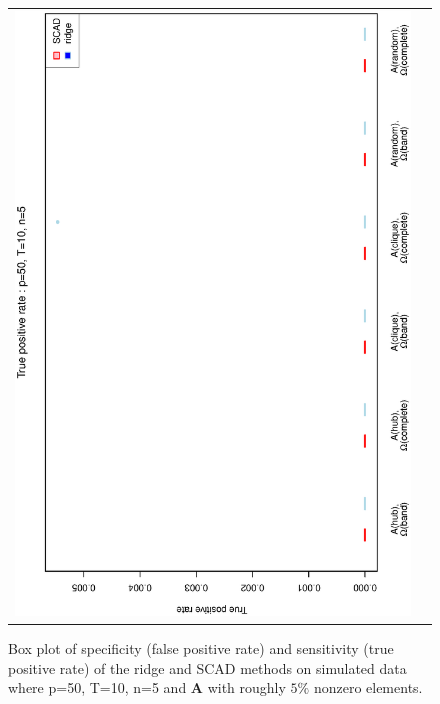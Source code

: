 \documentclass[a4paper]{article}
\begin{document}
\begin{figure}[h!]
\begin{tabular}{cc}
\includegraphics[scale=0.45,angle=270]{ROCtpr50T10N5_5.eps}
\end{tabular}
\caption{Box plot of specificity (false positive rate) and sensitivity (true positive rate) of the ridge and SCAD methods on simulated data where p=50, T=10,  n=5  and $\mathbf{A}$ with roughly $5\%$ nonzero elements.}
\label{figSM:RocP50T10N5_5}
\end{figure}
\clearpage


\end{document}
